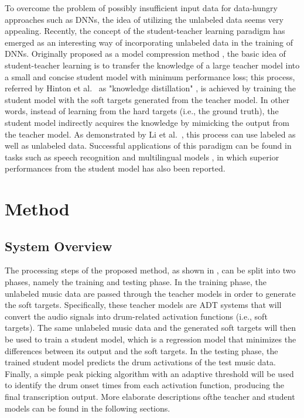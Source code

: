 \documentclass{article}
\begin{document}
To overcome the problem of possibly insufficient input data for data-hungry approaches such as DNNs, the idea of utilizing the unlabeled data seems very appealing. Recently, the concept of the student-teacher learning paradigm has emerged as an interesting way of incorporating unlabeled data in the training of DNNs. Originally proposed as a model compression method \cite{Bucilua2006}, the basic idea of student-teacher learning is to transfer the knowledge of a large teacher model into a small and concise student model with minimum performance loss; this process, referred by Hinton et al.~ as "knowledge distillation" \cite{Hinton2015}, is achieved by training the student model with the soft targets generated from the teacher model. In other words, instead of learning from the hard targets (i.e., the ground truth), the student model indirectly acquires the knowledge by mimicking the output from the teacher model. As demonstrated by Li et al.~\cite{Li2014}, this process can use labeled as well as unlabeled data. Successful applications of this paradigm can be found in tasks such as speech recognition \cite{Watanabe2017} and multilingual models \cite{Cui2017}, in which superior performances from the student model has also been reported.

\section{Method}\label{sec:method}
\subsection{System Overview}
The processing steps of the proposed method, as shown in , can be split into two phases, namely the training and testing phase. In the training phase, the unlabeled music data are passed through the teacher models in order to generate the soft targets. Specifically, these teacher models are ADT systems that will convert the audio signals into drum-related activation functions (i.e., soft targets). The same unlabeled music data and the generated soft targets will then be used to train a student model, which is a regression model that minimizes the differences between its output and the soft targets. In the testing phase, the trained student model predicts the drum activations of the test music data. Finally, a simple peak picking algorithm with an adaptive threshold will be used to identify the drum onset times from each activation function, producing the final transcription output. More elaborate descriptions ofthe teacher and student models can be found in the following sections.  
\end{document}
